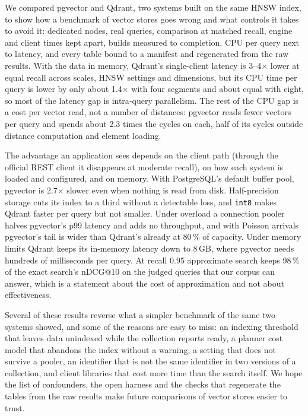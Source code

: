 \documentclass[preprint,12pt]{elsarticle}
\begin{document}
We compared pgvector and Qdrant, two systems built on the same HNSW index, to show how a benchmark of vector stores goes wrong and what controls it takes to
avoid it: dedicated nodes, real queries, comparison at matched recall, engine and client times kept apart, builds measured to completion, CPU per query next to latency, and every table bound to a
manifest and regenerated from the raw results. With the data in memory, Qdrant's single-client latency is 3--4$\times$ lower at equal recall across scales, HNSW settings and dimensions, but its CPU time per
query is lower by only about 1.4$\times$ with four segments and about equal with eight, so most of the latency gap is intra-query parallelism. The rest of the CPU gap is a cost per vector read, not a
number of distances: pgvector reads fewer vectors per query and spends about 2.3 times the cycles on each, half of its cycles outside distance computation and element loading.

The advantage an application sees depends on the client path (through the official REST client it disappears at moderate recall), on how each system is loaded and configured, and on memory.
With PostgreSQL's default buffer pool, pgvector is 2.7$\times$ slower even when nothing is read from disk. Half-precision storage cuts its index to a third without a detectable loss, and
\texttt{int8} makes Qdrant faster per query but not smaller. Under overload a connection pooler halves pgvector's p99 latency and adds no throughput, and with Poisson arrivals pgvector's tail is wider than Qdrant's already at 80\,\% of capacity.
Under memory limits Qdrant keeps its in-memory latency down to 8\,GB, where pgvector needs hundreds of milliseconds per query. At recall 0.95 approximate search keeps 98\,\% of the exact search's nDCG@10 on the judged queries that
our corpus can answer, which is a statement about the cost of approximation and not about effectiveness.

Several of these results reverse what a simpler benchmark of the same two systems showed, and some of the reasons are easy to miss: an indexing threshold that leaves data unindexed while the collection reports ready, a planner cost model that abandons
the index without a warning, a setting that does not survive a pooler, an identifier that is not the same identifier in two versions of a collection, and client libraries that cost more time than the search itself. We hope the list of
confounders, the open harness and the checks that regenerate the tables from the raw results make future comparisons of vector stores easier to trust.
\end{document}
